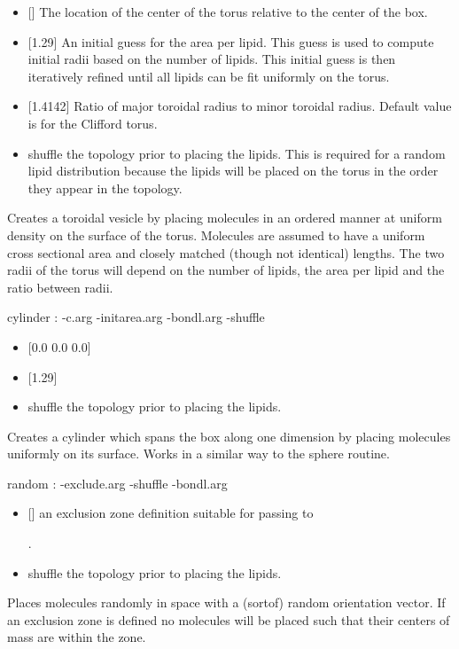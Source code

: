 \begin{itemize}
\item {} [] The location of the center of the torus relative to the center of the box.
\item {} [1.29] An initial guess for the area per lipid. This guess is used to compute initial radii based on the number of lipids. This initial guess is then iteratively refined until all lipids can be fit uniformly on the torus.
\item {} [1.4142] Ratio of major toroidal radius to minor toroidal radius. Default value is for the Clifford torus.
\item {} shuffle the topology prior to placing the lipids. This is required for a random lipid distribution because the lipids will be placed on the torus in the order they appear in the topology.
\end{itemize}
Creates a toroidal vesicle by placing molecules in an ordered manner at uniform density on the surface of the torus. Molecules are assumed to have a uniform cross sectional area and closely matched (though not identical) lengths. The two radii of the torus will depend on the number of lipids, the area per lipid and the ratio between radii.
\begin{code}
  cylinder : -c.arg -initarea.arg -bondl.arg -shuffle
\end{code}
\begin{itemize}
\item {} [{0.0 0.0 0.0}]
\item {} [1.29]
\item {} shuffle the topology prior to placing the lipids.
\end{itemize}
Creates a cylinder which spans the box along one dimension by placing molecules uniformly on its surface. Works in a similar way to the sphere routine.
\begin{code}
  random : -exclude.arg -shuffle -bondl.arg
\end{code}
\begin{itemize}
  \item {} [] an exclusion zone definition suitable for passing to 

.
  \item {} shuffle the topology prior to placing the lipids.
  \end{itemize}
Places molecules randomly in space with a (sortof) random orientation vector. If an exclusion zone is defined no molecules will be placed such that their centers of mass are within the zone.

